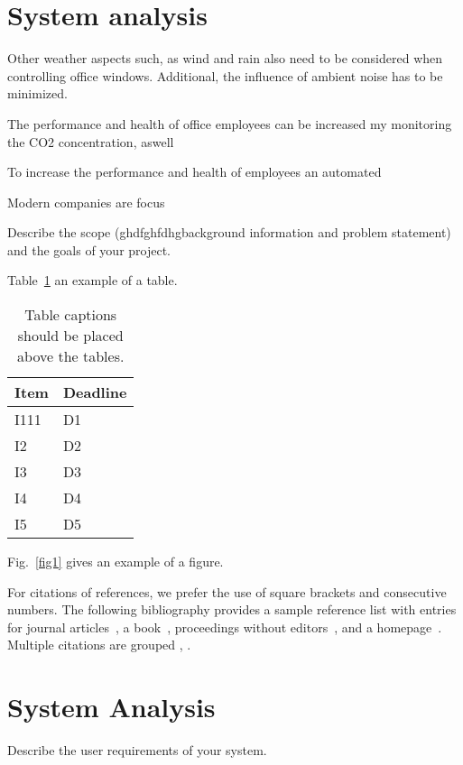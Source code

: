 \documentclass[runningheads]{llncs}
\begin{document}
\newpage

\section{System analysis}
Other weather aspects such, as wind and rain also need to be considered when controlling office windows. Additional, the influence of ambient noise has to be minimized. 




The performance and health of office employees can be increased my monitoring the CO2 concentration, aswell   

To increase the performance and health of employees an automated  



Modern companies are focus




Describe the scope (ghdfghfdhgbackground information and problem statement) and the goals of your project.

Table~\ref{tab1} an example of a table.

\begin{table}
\caption{Table captions should be placed above the
tables.}\label{tab1}
\begin{tabular}{|l|l|}
\hline
Item & Deadline \\
\hline
I111 & D1 \\
I2 & D2 \\
I3 & D3 \\
I4 & D4 \\
I5 & D5 \\
\hline
\end{tabular}
\end{table}

Fig.~\ref{fig1} gives an example of a figure.


For citations of references, we prefer the use of square brackets
and consecutive numbers. The following bibliography provides
a sample reference list with entries for journal
articles~\cite{ref_article1}, a book~\cite{ref_book1}, proceedings without editors~\cite{ref_proc1},
and a homepage~\cite{ref_url1}. Multiple citations are grouped
\cite{ref_article1,ref_book1},
\cite{ref_article1,ref_book1,ref_proc1,ref_url1}.

\section{System Analysis}
Describe the user requirements of your system.
\end{document}

